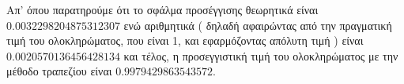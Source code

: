 \documentclass[Second Project.tex]{subfiles}
\begin{document}
Απ' όπου παρατηρούμε ότι το σφάλμα προσέγγισης θεωρητικά είναι \\ $0.0032298204875312307$ ενώ αριθμητικά ( δηλαδή 
αφαιρώντας από την πραγματική τιμή του ολοκληρώματος, που είναι 1, και εφαρμόζοντας απόλυτη τιμή ) είναι
$0.0020570136456428134$ και τέλος, η προσεγγιστική τιμή του ολοκληρώματος με την μέθοδο τραπεζίου
είναι $0.9979429863543572$. 
\newpage
\end{document}
